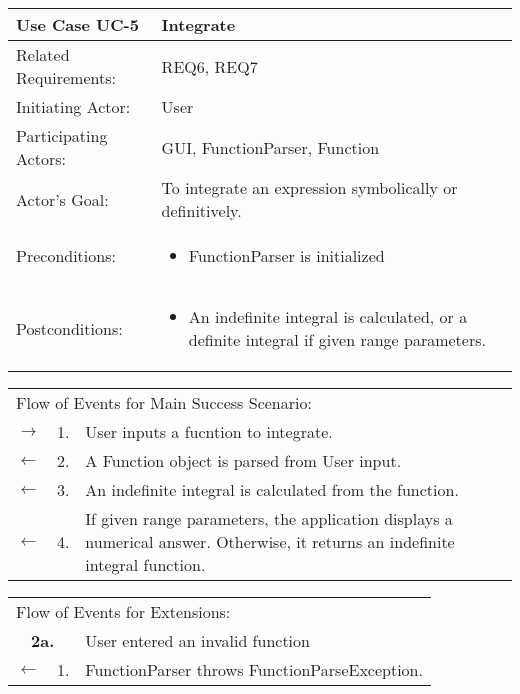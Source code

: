 \documentclass[11pt]{article}
\begin{document}
\newpage
\begin{center}
\begin{tabular}{p{1.5in}p{5in}}
\hline
\textbf{Use Case UC-5}     & \textbf{Integrate} \\ \hline
Related Requirements: & REQ6, REQ7 \\
Initiating Actor:     & User \\
Participating Actors: & GUI, FunctionParser, Function \\
Actor's Goal:          & To integrate an expression symbolically or definitively. \\
Preconditions:         & \begin{itemize}[nosep]
		      \item  FunctionParser is initialized
                         \end{itemize} \\
Postconditions:        & \begin{itemize}[nosep]
                         \item An indefinite integral is calculated, or a definite integral if given range parameters.
                         \end{itemize} \\ \hline
\end{tabular}

\begin{tabular}{p{.25in}p{.25in}p{5.8in}}
\multicolumn{3}{l}{Flow of Events for Main Success Scenario:} \\
$\rightarrow$ & 1. & User inputs a fucntion to integrate.\\
$\leftarrow$  & 2. & A Function object is parsed from User input.\\
$\leftarrow$  & 3. & An indefinite integral is calculated from the function.\\
$\leftarrow$  & 4. & If given range parameters, the application displays a numerical answer. Otherwise, it returns an indefinite integral function. 
\end{tabular}

\begin{tabular}{p{.25in}p{.25in}p{5.8in}}
\multicolumn{3}{l}{Flow of Events for Extensions:} \\
\multicolumn{2}{c}{\textbf{2a.}} & User entered an invalid function \\
$\leftarrow$  & 1.           & FunctionParser throws FunctionParseException.\\
\end{tabular}
\end{center}
\end{document}
